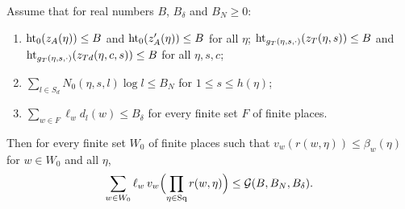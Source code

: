\begin{proposition}\label{pf:fit:gridheight}
Assume that for real numbers $B$, $B_\delta$ and $B_N\ge0$:
\begin{enumerate}[label=(\roman*)]
\item $\operatorname{ht}_0(z_A(\eta))\le B$ and $\operatorname{ht}_0(z'_A(\eta))\le B$ for all $\eta$; $\operatorname{ht}_{g_T(\eta,s,\cdot)}(z_T(\eta,s))\le B$
and $\operatorname{ht}_{g_T(\eta,s,\cdot)}(z_{Td}(\eta,c,s))\le B$ for all $\eta,s,c$;
\item $\sum_{l\in S_d}N_0(\eta,s,l)\log l\le B_N$ for $1\le s\le h(\eta)$;
\item $\sum_{w\in F}\ell_wd_l(w)\le B_\delta$ for every finite set $F$ of finite places.
\end{enumerate}
Then for every finite set $W_0$ of finite places such that $v_w(r(w,\eta))\le\beta_w(\eta)$ for $w\in W_0$ and all
$\eta$,
\[
\sum_{w\in W_0}\ell_w\,v_w\Bigl(\prod_{\eta\in\mathrm{Sq}}r(w,\eta)\Bigr)\le\mathcal{G}(B,B_N,B_\delta).
\]
\end{proposition}

